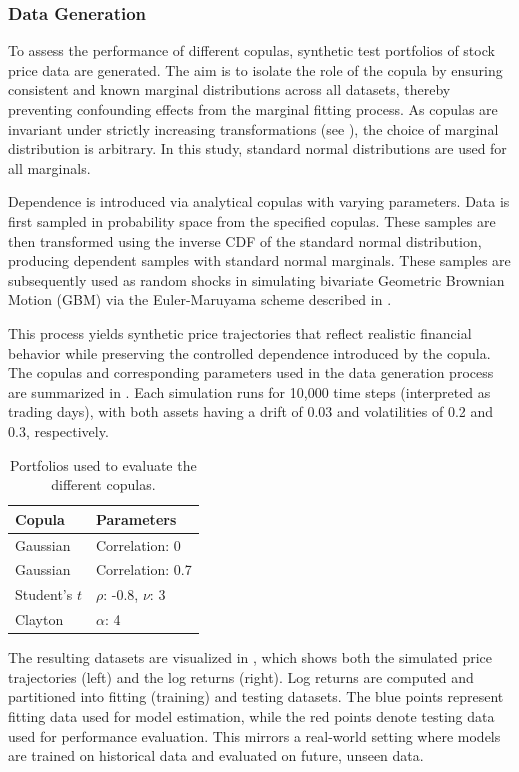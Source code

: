 \subsubsection{Data Generation}
To assess the performance of different copulas, synthetic test portfolios of stock price data are generated. The aim is to isolate the role of the copula by ensuring consistent and known marginal distributions across all datasets, thereby preventing confounding effects from the marginal fitting process. As copulas are invariant under strictly increasing transformations (see ), the choice of marginal distribution is arbitrary. In this study, standard normal distributions are used for all marginals.

Dependence is introduced via analytical copulas with varying parameters. Data is first sampled in probability space from the specified copulas. These samples are then transformed using the inverse CDF of the standard normal distribution, producing dependent samples with standard normal marginals. These samples are subsequently used as random shocks in simulating bivariate Geometric Brownian Motion (GBM) via the Euler-Maruyama scheme described in .

This process yields synthetic price trajectories that reflect realistic financial behavior while preserving the controlled dependence introduced by the copula. The copulas and corresponding parameters used in the data generation process are summarized in . Each simulation runs for 10,000 time steps (interpreted as trading days), with both assets having a drift of 0.03 and volatilities of 0.2 and 0.3, respectively.

\begin{table}[h!]
    \centering
    \caption{Portfolios used to evaluate the different copulas.}
    \begin{tabular}{ll}
    \textbf{Copula} & \textbf{Parameters} \\
    \hline
    Gaussian & Correlation: 0 \\
    Gaussian & Correlation: 0.7\\
    Student's $t$ & $\rho$: -0.8, $\nu$: 3\\
    Clayton & $\alpha$: 4 \\
    \end{tabular}
    \label{tab:DatasetsUsed}
\end{table}

The resulting datasets are visualized in , which shows both the simulated price trajectories (left) and the log returns (right). Log returns are computed and partitioned into fitting (training) and testing datasets. The blue points represent fitting data used for model estimation, while the red points denote testing data used for performance evaluation. This mirrors a real-world setting where models are trained on historical data and evaluated on future, unseen data.

